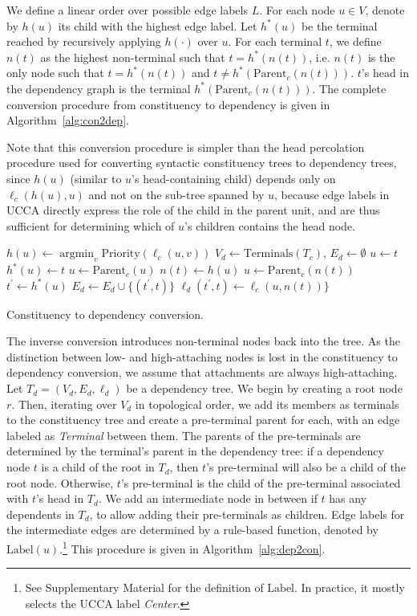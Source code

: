 \documentclass[11pt,letterpaper]{article}
\DeclareMathOperator*{\argmin}{argmin}
\begin{document}
We define a linear order over possible edge labels $L$.
For each node $u \in V$, denote by $h(u)$ its child with the highest edge label.
Let $h^*(u)$ be the terminal reached by recursively applying $h(\cdot)$ over $u$.
For each terminal $t$, we define $n(t)$ as the highest
non-terminal such that $t=h^*(n(t))$, i.e.
$n(t)$ is the only node such that $t=h^*(n(t))$ and $t \neq h^*(\mathrm{Parent}_c(n(t)))$.
$t$'s head in the dependency graph is
the terminal $h^*(\mathrm{Parent}_c(n(t)))$.
The complete conversion procedure from constituency to dependency is given in Algorithm~\ref{alg:con2dep}.

Note that this conversion procedure is simpler than the
head percolation procedure used for converting syntactic constituency
trees to dependency trees,
since $h(u)$ (similar to $u$'s head-containing child)
depends only on $\ell_c(h(u),u)$ and not on the sub-tree spanned by $u$,
because edge labels in UCCA directly express the role of the child in the parent unit, and
are thus sufficient for determining which of $u$'s children contains the head node.

\begin{algorithm}[t]
  \small
  {
  $h(u) \leftarrow \argmin_v \mathrm{Priority}(\ell_c(u,v))$\;
 }
 $V_d \leftarrow \mathrm{Terminals}({T_c})$,
 $E_d \leftarrow \emptyset$\;
  {
  $u \leftarrow t$\;
   {
  	$h^*(u) \leftarrow t$\;
  	$u \leftarrow \mathrm{Parent}_c(u)$\;
  }
  $n(t) \leftarrow h(u)$\;
 }
  {
  $u \leftarrow \mathrm{Parent}_c(n(t))$\;
  $t^\prime \leftarrow h^*(u)$\;
  $E_d \leftarrow E_d \cup \{(t^\prime, t)\}$\;
  $\ell_d (t^\prime, t) \leftarrow \ell_c(u, n(t))\}$\;
 }
 \caption{\small Constituency to dependency conversion.}
 \label{alg:con2dep}
\end{algorithm}

The inverse conversion introduces non-terminal nodes back into the tree.
As the distinction between low- and high-attaching nodes is lost in the constituency to
dependency conversion, we assume that attachments are always
high-attaching.
Let $T_d=(V_d,E_d,\ell_d)$ be a dependency tree.
We begin by creating a root node $r$.
Then, iterating over $V_d$ in topological order,
we add its members as terminals to the constituency tree
and create a pre-terminal parent for each,
with an edge labeled as \textit{Terminal} between them.
The parents of the pre-terminals are determined by the terminal's parent in the dependency
tree: if a dependency node $t$ is a child of the root in $T_d$, then $t$'s pre-terminal will also be a child of the root node. Otherwise, $t$'s pre-terminal is the child of the pre-terminal associated with $t$'s head in $T_d$. We add an intermediate node in between if $t$ has any dependents in $T_d$,
to allow adding their pre-terminals as children.
Edge labels for the intermediate edges are determined by a rule-based function, denoted by $\mathrm{Label}(u)$.\footnote{See Supplementary Material for the definition of $\mathrm{Label}$.
In practice, it mostly selects the UCCA label \textit{Center}.}
This procedure is given in Algorithm~\ref{alg:dep2con}.
\end{document}
